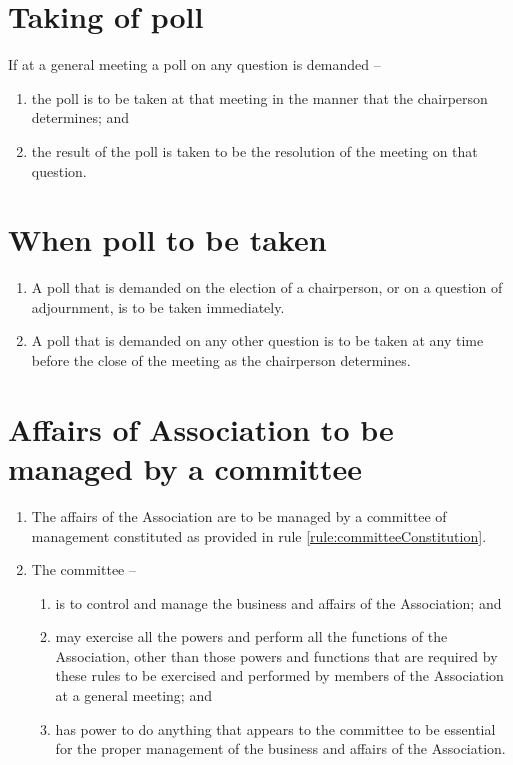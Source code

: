 \documentclass[a4paper,11pt]{article}
\begin{document}
\section{Taking of poll}
\label{rule:poll}

If at a general meeting a poll on any question is demanded --
\begin{enumerate}
	\item the poll is to be taken at that meeting in the manner that the chairperson determines; and
	\item the result of the poll is taken to be the resolution of the meeting on that question.
\end{enumerate}

\section{When poll to be taken}
\label{rule:polls}

\begin{enumerate}
	\item A poll that is demanded on the election of a chairperson, or on a question of adjournment, is to be taken immediately.
	\item A poll that is demanded on any other question is to be taken at any time before the close of the meeting as the chairperson determines.
\end{enumerate}

\section{Affairs of Association to be managed by a committee}
\label{rule:committeeAffairs}

\begin{enumerate}
	\item The affairs of the Association are to be managed by a committee of management constituted as provided in rule \ref{rule:committeeConstitution}.

	\item The committee --
	\begin{enumerate}
		\item is to control and manage the business and affairs of the Association; and
		\item may exercise all the powers and perform all the functions of the Association, other than those powers and functions that are required by these rules to be exercised and performed by members of the Association at a general meeting; and
		\item has power to do anything that appears to the committee to be essential for the proper management of the business and affairs of the Association.
	\end{enumerate}
\end{enumerate}
\end{document}
